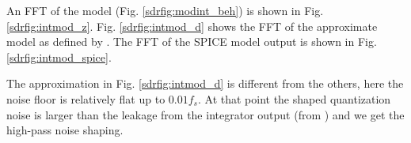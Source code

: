 


An FFT of the \simulink model (Fig. \ref{sdrfig:modint_beh}) is shown in
Fig. \ref{sdrfig:intmod_z}. Fig. \ref{sdrfig:intmod_d} shows the FFT of the
approximate model as defined by . The FFT of the SPICE model output is shown in
Fig. \ref{sdrfig:intmod_spice}.

 The
approximation in Fig. \ref{sdrfig:intmod_d} is different from the others, here
the noise floor is relatively flat up to $0.01f_s$. At that
point the shaped quantization noise is larger than the leakage from the
integrator output (from ) and we get
the high-pass noise shaping. 

